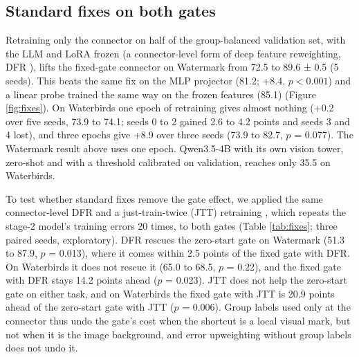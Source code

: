 \subsection{Standard fixes on both gates}

Retraining only the connector on half of the group-balanced validation set, with the LLM and LoRA frozen (a
connector-level form of deep feature reweighting, DFR \citep{kirichenko2023dfr}), lifts the fixed-gate connector on
Watermark from 72.5 to 89.6 ± 0.5 (5 seeds). This beats the same fix on the MLP projector (81.2; +8.4,
\(p < 0.001\)) and a linear probe trained the same way on the frozen features (85.1) (Figure \ref{fig:fixes}). On
Waterbirds one epoch of retraining gives almost nothing (+0.2 over five seeds, 73.9 to 74.1; seeds 0 to 2 gained
2.6 to 4.2 points and seeds 3 and 4 lost), and three epochs give +8.9 over three seeds (73.9 to 82.7, \(p\) = 0.077).
The Watermark result above uses one epoch.
Qwen3.5-4B with its own vision tower, zero-shot and with a threshold calibrated on validation, reaches only 35.5 on
Waterbirds.

To test whether standard fixes remove the gate effect, we applied the same connector-level DFR and a
just-train-twice (JTT) retraining \citep{liu2021jtt}, which repeats the stage-2 model's training errors 20 times, to both
gates (Table \ref{tab:fixes}; three paired seeds, exploratory). DFR rescues the zero-start gate on Watermark (51.3 to
87.9, \(p\) = 0.013), where it comes within 2.5 points of the fixed gate with DFR. On Waterbirds it does not rescue it
(65.0 to 68.5, \(p\) = 0.22), and the fixed gate with DFR stays 14.2 points ahead (\(p\) = 0.023). JTT does not help the
zero-start gate on either task, and on Waterbirds the fixed gate with JTT is 20.9 points ahead of the zero-start gate
with JTT (\(p\) = 0.006). Group labels used only at the connector thus undo the gate's cost when the shortcut is a
local visual mark, but not when it is the image background, and error upweighting without group labels does not
undo it.

